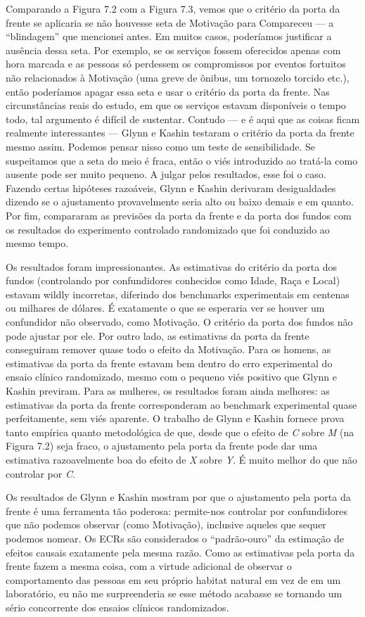 \documentclass[11pt,a5paper,twoside]{book}
\begin{document}
Comparando a Figura 7.2 com a Figura 7.3, vemos que o critério da porta da frente se aplicaria se não houvesse seta de Motivação para Compareceu — a “blindagem” que mencionei antes. Em muitos casos, poderíamos justificar a ausência dessa seta. Por exemplo, se os serviços fossem oferecidos apenas com hora marcada e as pessoas só perdessem os compromissos por eventos fortuitos não relacionados à Motivação (uma greve de ônibus, um tornozelo torcido etc.), então poderíamos apagar essa seta e usar o critério da porta da frente. Nas circunstâncias reais do estudo, em que os serviços estavam disponíveis o tempo todo, tal argumento é difícil de sustentar. Contudo — e é aqui que as coisas ficam realmente interessantes — Glynn e Kashin testaram o critério da porta da frente mesmo assim. Podemos pensar nisso como um teste de sensibilidade. Se suspeitamos que a seta do meio é fraca, então o viés introduzido ao tratá-la como ausente pode ser muito pequeno. A julgar pelos resultados, esse foi o caso. Fazendo certas hipóteses razoáveis, Glynn e Kashin derivaram desigualdades dizendo se o ajustamento provavelmente seria alto ou baixo demais e em quanto. Por fim, compararam as previsões da porta da frente e da porta dos fundos com os resultados do experimento controlado randomizado que foi conduzido ao mesmo tempo.

Os resultados foram impressionantes. As estimativas do critério da porta dos fundos (controlando por confundidores conhecidos como Idade, Raça e Local) estavam wildly incorretas, diferindo dos benchmarks experimentais em centenas ou milhares de dólares. É exatamente o que se esperaria ver se houver um confundidor não observado, como Motivação. O critério da porta dos fundos não pode ajustar por ele. Por outro lado, as estimativas da porta da frente conseguiram remover quase todo o efeito da Motivação. Para os homens, as estimativas da porta da frente estavam bem dentro do erro experimental do ensaio clínico randomizado, mesmo com o pequeno viés positivo que Glynn e Kashin previram. Para as mulheres, os resultados foram ainda melhores: as estimativas da porta da frente corresponderam ao benchmark experimental quase perfeitamente, sem viés aparente. O trabalho de Glynn e Kashin fornece prova tanto empírica quanto metodológica de que, desde que o efeito de \textit{C} sobre \textit{M} (na Figura 7.2) seja fraco, o ajustamento pela porta da frente pode dar uma estimativa razoavelmente boa do efeito de \textit{X} sobre \textit{Y}. É muito melhor do que não controlar por \textit{C}.

Os resultados de Glynn e Kashin mostram por que o ajustamento pela porta da frente é uma ferramenta tão poderosa: permite-nos controlar por confundidores que não podemos observar (como Motivação), inclusive aqueles que sequer podemos nomear. Os ECRs são considerados o “padrão-ouro” da estimação de efeitos causais exatamente pela mesma razão. Como as estimativas pela porta da frente fazem a mesma coisa, com a virtude adicional de observar o comportamento das pessoas em seu próprio habitat natural em vez de em um laboratório, eu não me surpreenderia se esse método acabasse se tornando um sério concorrente dos ensaios clínicos randomizados.
\end{document}
